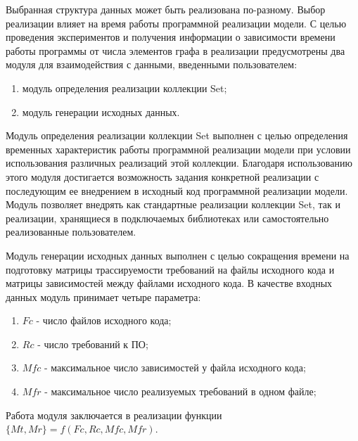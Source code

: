 Выбранная структура данных может быть реализована по-разному. Выбор реализации влияет на время работы программной реализации модели. С целью проведения экспериментов и получения информации о зависимости времени работы программы от числа элементов графа в реализации предусмотрены два модуля для взаимодействия с данными, введенными пользователем:
\begin{enumerate}
    \item модуль определения реализации коллекции Set;
    \item модуль генерации исходных данных.
\end{enumerate}

Модуль определения реализации коллекции Set выполнен с целью определения временных характеристик работы программной реализации модели при условии использования различных реализаций этой коллекции. Благодаря использованию этого модуля достигается возможность задания конкретной реализации с последующим ее внедрением в исходный код программной реализации модели. Модуль позволяет внедрять как стандартные реализации коллекции Set, так и реализации, хранящиеся в подключаемых библиотеках или самостоятельно реализованные пользователем.

Модуль генерации исходных данных выполнен с целью сокращения времени на подготовку матрицы трассируемости требований на файлы исходного кода и матрицы зависимостей между файлами исходного кода. В качестве входных данных модуль принимает четыре параметра:
\begin{enumerate}
    \item $Fc$ - число файлов исходного кода;
    \item $Rc$ - число требований к ПО;
    \item $Mfc$ - максимальное число зависимостей у файла исходного кода;
    \item $Mfr$ - максимальное число реализуемых требований в одном файле;
\end{enumerate}

Работа модуля заключается в реализации функции $\{Mt, Mr\} = f(Fc, Rc, Mfc, Mfr)$.